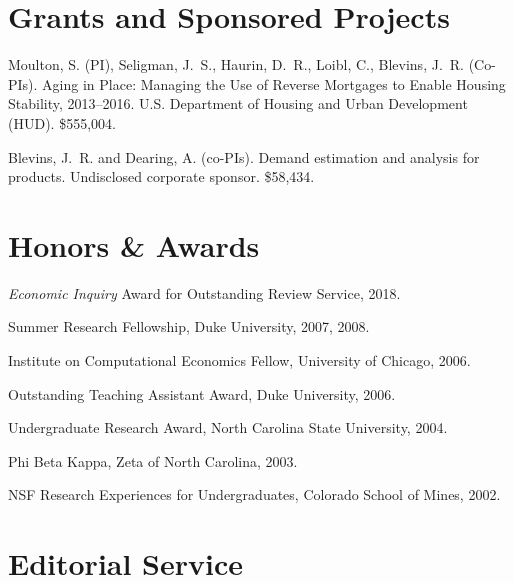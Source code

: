\documentclass[10pt,letterpaper]{article}
\renewenvironment{itemize}{
  \begin{list}{}{
      \setlength{\leftmargin}{1.5em}
      \setlength{\itemsep}{0.25em}
      \setlength{\parskip}{0pt}
      \setlength{\parsep}{0.25em}
    }
}{
  \end{list}
}
\begin{document}
\section*{Grants and Sponsored Projects}

\begin{itemize}
\item Moulton, S. (PI),
  Seligman, J.~S., Haurin, D.~R., Loibl, C., Blevins, J.~R. (Co-PIs).
  Aging in Place: Managing the Use of Reverse Mortgages to Enable Housing Stability,
  2013--2016.
  U.S. Department of Housing and Urban Development (HUD).
  \$555,004.
\item Blevins, J.~R. and Dearing, A. (co-PIs).
  Demand estimation and analysis for products.
  Undisclosed corporate sponsor.
  \$58,434.
\end{itemize}

\section*{Honors \& Awards}

\begin{itemize}
\item \textit{Economic Inquiry} Award for Outstanding Review Service, 2018.
\item Summer Research Fellowship, Duke University, 2007, 2008.
\item Institute on Computational Economics Fellow, University of Chicago, 2006.
\item Outstanding Teaching Assistant Award, Duke University, 2006.
\item Undergraduate Research Award, North Carolina State University, 2004.
\item Phi Beta Kappa, Zeta of North Carolina, 2003.
\item NSF Research Experiences for Undergraduates, Colorado School of Mines, 2002.
\end{itemize}

\section*{Editorial Service}
\end{document}
